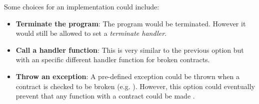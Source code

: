 Some choices for an implementation could include:

\begin{itemize}

\item \textbf{Terminate the program}: The program would be terminated. However
it would still be allowed to set a \emph{terminate handler}.

\item \textbf{Call a handler function}: This is very similar to the previous
option but with an specific different handler function for broken contracts.

\item \textbf{Throw an exception}: A pre-defined exception could be thrown when
a contract is checked to be broken (e.g. ). However,
this option could eventually prevent that any function with a contract could be
made .

\end{itemize}

